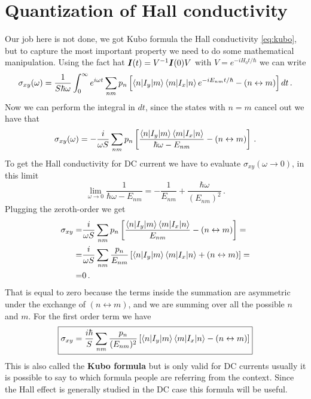\section{Quantization of Hall conductivity}
Our job here is not done, we got Kubo formula the Hall conductivity \ref{eq:kubo}, but to capture the most important property we need to do some mathematical manipulation. Using the fact hat $\boldsymbol{I}(t)=V^{-1}\boldsymbol{I}(0) V$ with $V=e^{-iH_0t/\hbar}$ we can write
\[
    \sigma_{xy}(\omega)=\frac 1{S\hbar \omega}\int_0^{\infty}e^{i\omega t}\sum_{nm}p_n
    \left[
        \braket{n|I_y}{m}\braket{m|I_x}{n}e^{-iE_{nm}t/\hbar}-(n\leftrightarrow m) %
    \right]
    dt\,.
\]
Now we can perform the integral in $dt$, since the states with $n=m$ cancel out we have that
\begin{equation}
    \sigma_{xy}(\omega)=-\frac i{\omega S} \sum_{nm}p_n\left[
        \frac{\braket{n|I_y}{m}\braket{m|I_x}{n}}{\hbar \omega - E_{nm}} - (n\leftrightarrow m)
    \right]\,.
\end{equation}
To get the Hall conductivity for DC current we have to evaluate $\sigma_{xy}(\omega\to 0)$, in this limit
\[
    \lim_{\omega\to 0}\frac{1}{\hbar \omega-E_{nm}}=-\frac 1{E_{nm}}+\frac{\hbar \omega}{(E_{nm})^2}    \,.
\]
Plugging the zeroth-order we get
\begin{equation}
    \begin{split}
    \sigma_{xy}=&\frac i{\omega S} \sum_{nm}p_n\left[
        \frac{\braket{n|I_y}{m}\braket{m|I_x}{n}}{E_{nm}} - (n\leftrightarrow m)
    \right]= \\
    =&\frac i{\omega S}\sum_{nm}\frac{p_n}{E_{nm}}\left[
        \braket{n|I_y}{m}\braket{m|I_x}{n} + (n\leftrightarrow m)
    \right]=\\
    =&0\,.
    \end{split}
\end{equation}
That is equal to zero because the terms inside the summation are asymmetric under the exchange of $(n\leftrightarrow m)$, and we are summing over all the possible $n$ and $m$. For the first order term we have
\begin{equation}
    \boxed{
    \sigma_{xy}=\frac{i\hbar}S\sum_{nm}\frac{p_n}{(E_{nm})^2}\left[
        \braket{n|I_y}{m}\braket{m|I_x}{n} - (n\leftrightarrow m)
    \right]
    }
    \label{eq:kkubo}
\end{equation}
This is also called the \textbf{Kubo formula} but is only valid for DC currents usually it is possible to say to which formula people are referring from the context. Since the Hall effect is generally studied in the DC case this formula will be useful.
